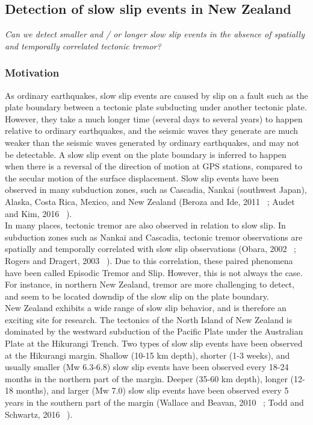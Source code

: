 \documentclass[letterpaper, 12pt]{article}
\begin{document}
\subsection{Detection of slow slip events in New Zealand}

\textit{Can we detect smaller and / or longer slow slip events in the absence of spatially and temporally correlated tectonic tremor?}

\subsubsection*{Motivation}

As ordinary earthquakes, slow slip events are caused by slip on a fault such as the plate boundary between a tectonic plate subducting under another tectonic plate. However, they take a much longer time (several days to several years) to happen relative to ordinary earthquakes, and the seismic waves they generate are much weaker than the seismic waves generated by ordinary earthquakes, and may not be detectable.  A slow slip event on the plate boundary is inferred to happen when there is a reversal of the direction of motion at GPS stations, compared to the secular motion of the surface displacement. Slow slip events have been observed in many subduction zones, such as Cascadia, Nankai (southwest Japan), Alaska, Costa Rica, Mexico, and New Zealand (Beroza and Ide, 2011 ~\cite{BER_2011}; Audet and Kim, 2016 ~\cite{AUD_2016}). \\

In many places, tectonic tremor are also observed in relation to slow slip. In subduction zones such as Nankai and Cascadia, tectonic tremor observations are spatially and temporally correlated with slow slip observations (Obara, 2002 ~\cite{OBA_2002}; Rogers and Dragert, 2003 ~\cite{ROG_2003}). Due to this correlation, these paired phenomena have been called Episodic Tremor and Slip. However, this is not always the case. For instance, in northern New Zealand, tremor are more challenging to detect, and seem to be located downdip of the slow slip on the plate boundary. \\

New Zealand exhibits a wide range of slow slip behavior, and is therefore an exciting site for research. The tectonics of the North Island of New Zealand is dominated by the westward subduction of the Pacific Plate under the Australian Plate at the Hikurangi Trench. Two types of slow slip events have been observed at the Hikurangi margin. Shallow (10-15 km depth), shorter (1-3 weeks), and usually smaller (Mw 6.3-6.8) slow slip events have been observed every 18-24 months in the northern part of the margin. Deeper (35-60 km depth), longer (12-18 months), and larger (Mw 7.0) slow slip events have been observed every 5 years in the southern part of the margin (Wallace and Beavan, 2010 ~\cite{WAL_2010}; Todd and Schwartz, 2016 ~\cite{TOD_2016}).\\
\end{document}
